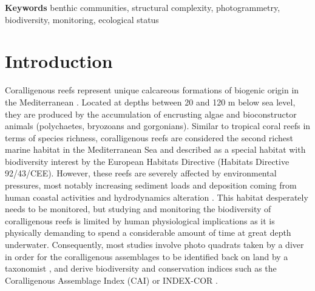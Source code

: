 \noindent\textbf{Keywords}
benthic communities, structural complexity, photogrammetry, biodiversity, monitoring, ecological status

\newpage

\section{Introduction}\label{chapitre4_1}
Coralligenous reefs represent unique calcareous formations of biogenic origin in the Mediterranean \citep{ballesteros_mediterranean_2006}. Located at depths between 20 and 120 m below sea level, they are produced by the accumulation of encrusting algae and bioconstructor animals (polychaetes, bryozoans and gorgonians). Similar to tropical coral reefs in terms of species richness, coralligenous reefs are considered the second richest marine habitat in the Mediterranean Sea \citep{boudouresque_marine_2004} and described as a special habitat with biodiversity interest by the European Habitats Directive (Habitats Directive 92/43/CEE). However, these reefs are severely affected by environmental pressures, most notably increasing sediment loads and deposition coming from human coastal activities and hydrodynamics alteration \citep{airoldi_effects_2003, ballesteros_mediterranean_2006}. This habitat desperately needs to be monitored, but studying and monitoring the biodiversity of coralligenous reefs is limited by human physiological implications as it is physically demanding to spend a considerable amount of time at great depth underwater. Consequently, most  studies involve photo quadrats taken by a diver in order for the coralligenous assemblages to be identified back on land by a taxonomist \citep{deter_rapid_2012, kipson_rapid_2011, sartoretto_integrated_2017}, and derive biodiversity and conservation indices such as the Coralligenous Assemblage Index (CAI) \citep{deter_preliminary_2012} or INDEX-COR \citep{sartoretto_integrated_2017}.

